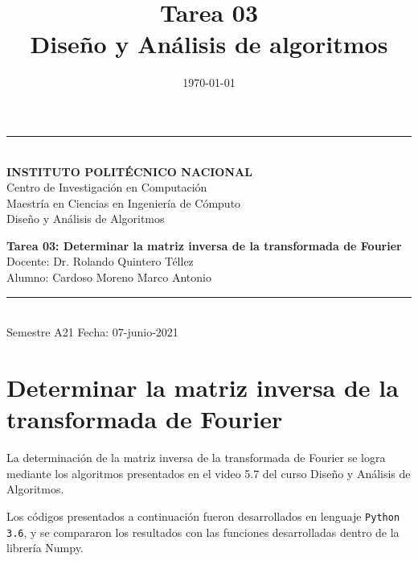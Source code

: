 \documentclass[letterpaper, 12pt]{article}
\date{\today}
\title{Tarea 03\\\medskip
\large Diseño y Análisis de algoritmos}
\newcommand{\parg}{\par \hfill \break}
\newcommand{\tarea}{Tarea 03: Determinar la matriz inversa de la
transformada de Fourier}
\newcommand{\fecha}{07-junio-2021}
\begin{document}
\begin{titlepage}
\begin{center}
        \vspace*{2mm}
        \rule{\textwidth}{1.5pt}\\
        \vspace*{5mm}
        \textbf{\Large INSTITUTO POLITÉCNICO NACIONAL}\\
        \vspace*{8mm}
        {\Large Centro de Investigación en Computación}\\
        \vspace{8mm}
        {\Large Maestría en Ciencias en Ingeniería de Cómputo}\\
        \vspace{19mm}
        {\Large Diseño y Análisis de Algoritmos}\\
        \vspace{49mm}




        \textbf{\large \tarea}\\





        \vspace*{48mm}
        {\large Docente: Dr. Rolando Quintero Téllez}\\
        \vspace*{20mm}
        {\large Alumno: Cardoso Moreno Marco Antonio}\\
        \vspace*{10mm}
        \rule{\textwidth}{1.5pt}\\
        {\large Semestre A21} \hfill {\large Fecha: \fecha}
    \end{center}
\end{titlepage}

\section{Determinar la matriz inversa de la transformada de Fourier}
\label{sec:orge4f464a}
\noindent
La determinación de la matriz inversa de la transformada de Fourier se logra
mediante los algoritmos presentados en el video 5.7 del curso Diseño y Análisis
de Algoritmos.
\parg
Los códigos presentados a continuación fueron desarrollados en lenguaje
\texttt{Python 3.6}, y se compararon los resultados con las funciones desarrolladas
dentro de la librería Numpy.
\end{document}
